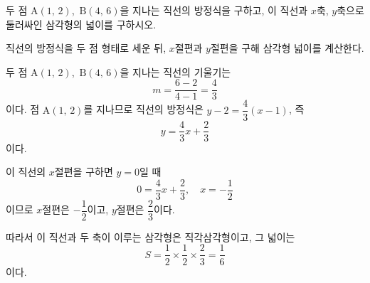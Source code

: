 \documentclass[10pt]{article}
\begin{document}

\newpage


\begin{dmproblem}
두 점 $\mathrm{A}(1,\,2)$,\ $\mathrm{B}(4,\,6)$을 지나는 직선의 방정식을 구하고, 이 직선과 $x$축, $y$축으로 둘러싸인 삼각형의 넓이를 구하시오.
\end{dmproblem}

\begin{dmapproach}
직선의 방정식을 두 점 형태로 세운 뒤, $x$절편과 $y$절편을 구해 삼각형 넓이를 계산한다.
\end{dmapproach}

\begin{dmsolution}
두 점 $\mathrm{A}(1,\,2)$,\ $\mathrm{B}(4,\,6)$을 지나는 직선의 기울기는
\begin{equation*}
  m = \frac{6 - 2}{4 - 1} = \frac{4}{3}
\end{equation*}
이다. 점 $\mathrm{A}(1,\,2)$를 지나므로 직선의 방정식은 $y - 2 = \dfrac{4}{3}(x - 1)$, 즉
\begin{equation*}
  y = \frac{4}{3}x + \frac{2}{3}
\end{equation*}
이다.

이 직선의 $x$절편을 구하면 $y = 0$일 때
\begin{equation*}
  0 = \frac{4}{3}x + \frac{2}{3},
  \quad x = -\frac{1}{2}
\end{equation*}
이므로 $x$절편은 $-\dfrac{1}{2}$이고, $y$절편은 $\dfrac{2}{3}$이다.

따라서 이 직선과 두 축이 이루는 삼각형은 직각삼각형이고, 그 넓이는
\begin{equation*}
  S = \frac{1}{2} \times \frac{1}{2} \times \frac{2}{3} = \frac{1}{6}
\end{equation*}
이다.
\end{dmsolution}
\end{document}

